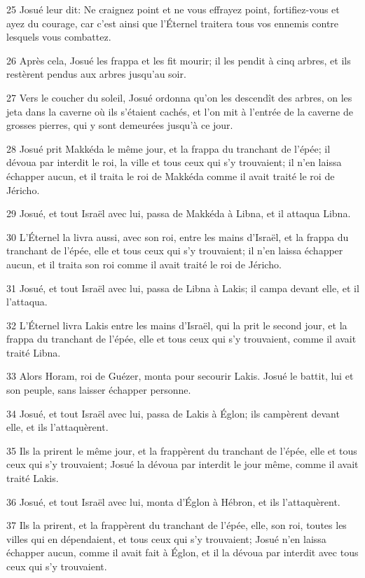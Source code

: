 \par 25 Josué leur dit: Ne craignez point et ne vous effrayez point, fortifiez-vous et ayez du courage, car c'est ainsi que l'Éternel traitera tous vos ennemis contre lesquels vous combattez.
\par 26 Après cela, Josué les frappa et les fit mourir; il les pendit à cinq arbres, et ils restèrent pendus aux arbres jusqu'au soir.
\par 27 Vers le coucher du soleil, Josué ordonna qu'on les descendît des arbres, on les jeta dans la caverne où ils s'étaient cachés, et l'on mit à l'entrée de la caverne de grosses pierres, qui y sont demeurées jusqu'à ce jour.
\par 28 Josué prit Makkéda le même jour, et la frappa du tranchant de l'épée; il dévoua par interdit le roi, la ville et tous ceux qui s'y trouvaient; il n'en laissa échapper aucun, et il traita le roi de Makkéda comme il avait traité le roi de Jéricho.
\par 29 Josué, et tout Israël avec lui, passa de Makkéda à Libna, et il attaqua Libna.
\par 30 L'Éternel la livra aussi, avec son roi, entre les mains d'Israël, et la frappa du tranchant de l'épée, elle et tous ceux qui s'y trouvaient; il n'en laissa échapper aucun, et il traita son roi comme il avait traité le roi de Jéricho.
\par 31 Josué, et tout Israël avec lui, passa de Libna à Lakis; il campa devant elle, et il l'attaqua.
\par 32 L'Éternel livra Lakis entre les mains d'Israël, qui la prit le second jour, et la frappa du tranchant de l'épée, elle et tous ceux qui s'y trouvaient, comme il avait traité Libna.
\par 33 Alors Horam, roi de Guézer, monta pour secourir Lakis. Josué le battit, lui et son peuple, sans laisser échapper personne.
\par 34 Josué, et tout Israël avec lui, passa de Lakis à Églon; ils campèrent devant elle, et ils l'attaquèrent.
\par 35 Ils la prirent le même jour, et la frappèrent du tranchant de l'épée, elle et tous ceux qui s'y trouvaient; Josué la dévoua par interdit le jour même, comme il avait traité Lakis.
\par 36 Josué, et tout Israël avec lui, monta d'Églon à Hébron, et ils l'attaquèrent.
\par 37 Ils la prirent, et la frappèrent du tranchant de l'épée, elle, son roi, toutes les villes qui en dépendaient, et tous ceux qui s'y trouvaient; Josué n'en laissa échapper aucun, comme il avait fait à Églon, et il la dévoua par interdit avec tous ceux qui s'y trouvaient.
